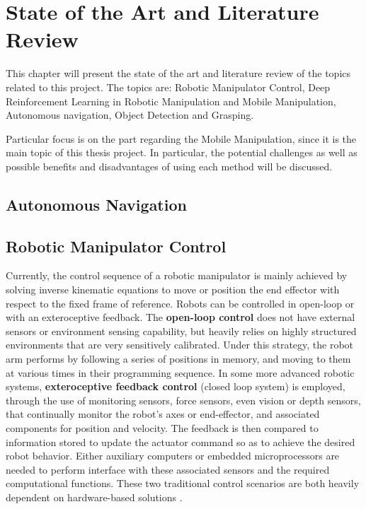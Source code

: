 
\chapter{State of the Art and Literature Review}

This chapter will present the state of the art and literature review of the topics related to this project.
The topics are: Robotic Manipulator Control, Deep Reinforcement Learning in Robotic Manipulation and Mobile
Manipulation, Autonomous navigation, Object Detection and Grasping.

Particular focus is on the part regarding the Mobile Manipulation, since it is the main topic of this thesis
project. In particular, the potential challenges as well as possible benefits and disadvantages of using each
method will be discussed.

\section{Autonomous Navigation}

\section{Robotic Manipulator Control}

Currently, the control sequence of a robotic manipulator is mainly achieved by solving
inverse kinematic equations to move or position the end effector with respect to the
fixed frame of reference. Robots can be controlled in open-loop or with
an exteroceptive feedback. The \textbf{open-loop control} does not have external sensors or
environment sensing capability, but heavily relies on highly structured environments
that are very sensitively calibrated. Under this strategy, the robot arm performs by
following a series of positions in memory, and moving to them at various times in their
programming sequence. In some more advanced robotic systems, \textbf{exteroceptive feedback
	control} (closed loop system) is employed, through the use of monitoring sensors, force sensors,
even vision or depth sensors, that continually monitor the robot's axes or end-effector, and
associated components for position and velocity. The feedback is then compared to information
stored to update the actuator command so as to achieve the desired robot behavior. Either
auxiliary computers or embedded microprocessors are needed to perform interface with
these associated sensors and the required computational functions. These two traditional
control scenarios are both heavily dependent on hardware-based solutions \cite{liu2021deep}.

